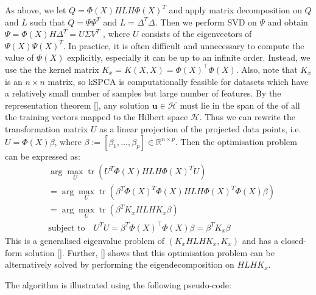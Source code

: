\documentclass[a4paper,12pt]{article}
\begin{document}
As above, we let $Q = \Phi(X) H L H \Phi(X)^{T}$ and apply matrix decomposition on $Q$ and $L$ such that $Q = \Psi \Psi^{T}$ and $L=\Delta^{T} \Delta$. Then we perform SVD on $\Psi$ and obtain $\Psi = \Phi(X) H \Delta^{T} = U \Sigma V^{T}$ , where $U$ consists of the eigenvectors of $\Psi(X) \Psi(X)^{T}$. In practice, it is often difficult and unnecessary to compute the value of ${\Phi}({X})$ explicitly, especially it can be up to an infinite order. Instead, we use the the kernel matrix ${K}_{x}={K}({X}, {X})={\Phi}({X})^{\top} {\Phi}({X})$. Also, note that ${K}_{x}$ is an $n \times n$ matrix, so kSPCA is computationally feasible for datasets which have a relatively small number of samples but large number of features. By the representation theorem [\cite{fulton2013representation}], any solution $\boldsymbol{u} \in \mathcal{H}$ must lie in the span of the of all the training vectors mapped to the Hilbert space $\mathcal{H}$. Thus we can rewrite the transformation matrix $U$ as a linear projection of the projected data points, i.e. $U =\Phi(X) \beta$, where $\beta:=\left[\beta_{1}, \ldots, \beta_{p}\right] \in \mathbb{R}^{n \times p}$. Then the optimisation problem can be expressed as:
\begin{align*}
& \arg \max _{U} \operatorname{tr}\left(U^{T} \Phi(X) H L H \Phi(X)^{T} U\right) \\
& = \arg \max _{U}  \operatorname{tr}\left(\beta^{T} \Phi(X)^{T} \Phi(X) H L H \Phi(X)^{T} \Phi(X) \beta\right) \\
& = \arg \max _{U} \operatorname{tr}\left(\beta^{T} {K}_{x}HLH{K}_{x} \beta\right) \\
& \text {subject to} \quad U^{T} U = \beta^{T} {\Phi}({X})^{\top} {\Phi}({X}) \beta = \beta^{T} {K}_{x} \beta
\end{align*}
This is a generalised eigenvalue problem of $({K}_{x}HLH{K}_{x}, {K}_{x})$ and has a closed-form solution [\cite{ghojogh2019eigenvalue}]. Further, [\cite{ghojogh2019unsupervised}] shows that this optimisation problem can be alternatively solved by performing the eigendecomposition on $HLH{K}_{x}$.

The algorithm is illustrated using the following pseudo-code:
\end{document}
